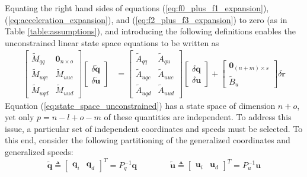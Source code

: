 \documentclass[smallcondensed]{svjour3}                     %
\begin{document}
Equating the right hand sides of equations (\ref{eq:f0_plus_f1_expansion}),
(\ref{eq:acceleration_expansion}),
and (\ref{eq:f2_plus_f3_expansion}) to zero (as in Table
\ref{table:assumptions}), and introducing the following definitions
enables the unconstrained linear state space equations to be written as
\begin{align}
  \label{eq:state_space_unconstrained}
  \left[
    \begin{array}{cc}
      \tilde{M}_{qq} & \bm{0}_{n \times o} \\
      \tilde{M}_{uqc} & \tilde{M}_{uuc} \\
      \tilde{M}_{uqd} & \tilde{M}_{uud}
    \end{array}
    \right]
    \left[
      \begin{array}{c}
        \delta \bm{\dot{q}} \\
        \delta \bm{\dot{u}}
      \end{array}
    \right]
   &=
   \left[
     \begin{array}{cc}
       \tilde{A}_{qq} & \tilde{A}_{qu} \\
       \tilde{A}_{uqc} & \tilde{A}_{uuc} \\
       \tilde{A}_{uqd} & \tilde{A}_{uud}
     \end{array}
   \right]
    \left[
      \begin{array}{c}
        \delta \bm{q} \\
        \delta \bm{u}
      \end{array}
    \right]
    +
    \left[
      \begin{array}{c}
        \bm{0}_{(n + m) \times s} \\
        \tilde{B}_{u}
      \end{array}
    \right]
    \delta \bm{r}
\end{align}
Equation (\ref{eq:state_space_unconstrained}) has a state space of dimension $n
+ o$, yet only $p = n - l + o - m$ of these quantities are independent.
To address this issue, a particular set of independent
coordinates and speeds must be selected. To this end, consider the following
partitioning of the generalized coordinates and generalized speeds:
\begin{equation*}
  \tilde{\bm{q}} \triangleq \left[\begin{array}{cc}\bm{q}_{i} &
      \bm{q}_{d}\end{array}\right]^{T} =  P_{q}^{-1} \bm{q}
      \qquad\qquad
  \tilde{\bm{u}} \triangleq \left[\begin{array}{cc}\bm{u}_{i} &
      \bm{u}_{d}\end{array}\right]^{T} =  P_{u}^{-1} \bm{u}
\end{equation*}
\end{document}
